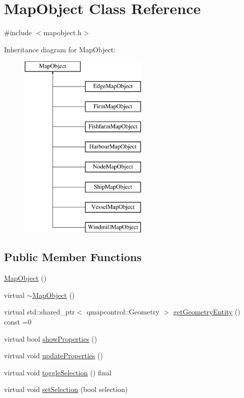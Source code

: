 \hypertarget{class_map_object}{}\section{Map\+Object Class Reference}
\label{class_map_object}


{\ttfamily \#include $<$mapobject.\+h$>$}

Inheritance diagram for Map\+Object\+:\begin{figure}[H]
\begin{center}
\leavevmode
\includegraphics[height=9.000000cm]{db/d5e/class_map_object}
\end{center}
\end{figure}
\subsection*{Public Member Functions}
\begin{DoxyCompactItemize}
\item 
\mbox{\hyperlink{class_map_object_a568754515cc72ce0861d30c3040d26d2}{Map\+Object}} ()
\item 
virtual \mbox{\hyperlink{class_map_object_aa601344267a49df197e841fcbd732209}{$\sim$\+Map\+Object}} ()
\item 
virtual std\+::shared\+\_\+ptr$<$ qmapcontrol\+::\+Geometry $>$ \mbox{\hyperlink{class_map_object_a82e055e41c862ec8d80d5bfb137b3253}{get\+Geometry\+Entity}} () const =0
\item 
virtual bool \mbox{\hyperlink{class_map_object_ac58ccb02d5d96d934939b217020c822c}{show\+Properties}} ()
\item 
virtual void \mbox{\hyperlink{class_map_object_afa7cd6a4368f4dd077614ac1d983a6c8}{update\+Properties}} ()
\item 
virtual void \mbox{\hyperlink{class_map_object_af78a9f7d342ad67c598c42554db3d626}{toggle\+Selection}} () final
\item 
virtual void \mbox{\hyperlink{class_map_object_ac127d8a4ba37ebce236c5f7dcf688273}{set\+Selection}} (bool selection)
\end{DoxyCompactItemize}


